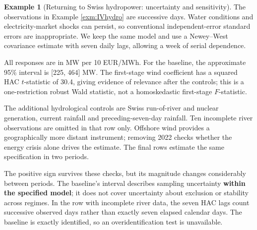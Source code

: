 \documentclass[
  11pt,
]{book}
\theoremstyle{definition}
\theoremstyle{definition}
\newtheorem{example}{Example}[chapter]
\theoremstyle{definition}
\theoremstyle{definition}
\theoremstyle{remark}
\begin{document}
\begin{example}[Returning to Swiss hydropower: uncertainty and sensitivity]
\protect\hypertarget{exm:hydro-inference}{}\label{exm:hydro-inference}The observations in Example \ref{exm:IVhydro} are successive days. Water conditions and electricity-market shocks can persist, so conventional independent-error standard errors are inappropriate. We keep the same model and use a Newey--West covariance estimate with seven daily lags, allowing a week of serial dependence.

\begin{table}[H]
\centering\begingroup\fontsize{10}{12}\selectfont

\endgroup{}
\end{table}

All responses are in MW per 10 EUR/MWh. For the baseline, the approximate 95\% interval is {[}225, 464{]} MW. The first-stage wind coefficient has a squared HAC \(t\)-statistic of 30.4, giving evidence of relevance after the controls; this is a one-restriction robust Wald statistic, not a homoskedastic first-stage \(F\)-statistic.

The additional hydrological controls are Swiss run-of-river and nuclear generation, current rainfall and preceding-seven-day rainfall. Ten incomplete river observations are omitted in that row only. Offshore wind provides a geographically more distant instrument; removing 2022 checks whether the energy crisis alone drives the estimate. The final rows estimate the same specification in two periods.

The positive sign survives these checks, but its magnitude changes considerably between periods. The baseline's interval describes sampling uncertainty \textbf{within the specified model}; it does not cover uncertainty about exclusion or stability across regimes. In the row with incomplete river data, the seven HAC lags count successive observed days rather than exactly seven elapsed calendar days. The baseline is exactly identified, so an overidentification test is unavailable.
\end{example}
\end{document}
